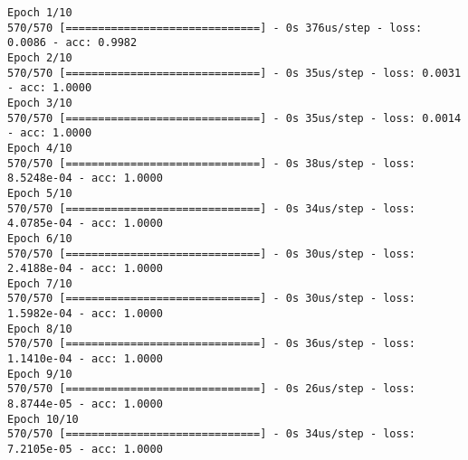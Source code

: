 \documentclass[11pt]{article}
\begin{document}
    \begin{Verbatim}[commandchars=\\\{\}]
Epoch 1/10
570/570 [==============================] - 0s 376us/step - loss: 0.0086 - acc: 0.9982
Epoch 2/10
570/570 [==============================] - 0s 35us/step - loss: 0.0031 - acc: 1.0000
Epoch 3/10
570/570 [==============================] - 0s 35us/step - loss: 0.0014 - acc: 1.0000
Epoch 4/10
570/570 [==============================] - 0s 38us/step - loss: 8.5248e-04 - acc: 1.0000
Epoch 5/10
570/570 [==============================] - 0s 34us/step - loss: 4.0785e-04 - acc: 1.0000
Epoch 6/10
570/570 [==============================] - 0s 30us/step - loss: 2.4188e-04 - acc: 1.0000
Epoch 7/10
570/570 [==============================] - 0s 30us/step - loss: 1.5982e-04 - acc: 1.0000
Epoch 8/10
570/570 [==============================] - 0s 36us/step - loss: 1.1410e-04 - acc: 1.0000
Epoch 9/10
570/570 [==============================] - 0s 26us/step - loss: 8.8744e-05 - acc: 1.0000
Epoch 10/10
570/570 [==============================] - 0s 34us/step - loss: 7.2105e-05 - acc: 1.0000

    \end{Verbatim}
\end{document}
